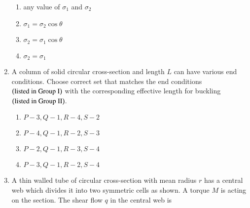 \documentclass[journal,onecolumn]{IEEEtran}
\theoremstyle{remark}
\begin{document}
\begin{enumerate}
\begin{center}
	\end{center}
	\begin{enumerate}
		\item any value of $\sigma_1$ and $\sigma_2$
		\item $\sigma_1 = \sigma_2 \cos{\theta}$
		\item $\sigma_2 = \sigma_1 \cos{\theta}$
		\item $\sigma_2 = \sigma_1$
	\end{enumerate}

    \item A column of solid circular cross-section and length $L$ can have various end conditions. Choose correct set that matches the end conditions $\left(\text{listed in Group I}\right)$ with the corresponding effective length for buckling $\left(\text{listed in Group II}\right)$.

	\begin{table}[h!]
		\centering
		
		\label{taba1.q64}
	\end{table}

	\begin{enumerate}
		\item $P - 3, Q - 1, R - 4, S - 2$
		\item $P - 4, Q - 1, R - 2, S - 3$
		\item $P - 2, Q - 1, R - 3, S - 4$
		\item $P - 3, Q - 1, R - 2, S - 4$
	\end{enumerate}

    \item A thin walled tube of circular cross-section with mean radius $r$ has a central web which divides it into two symmetric cells as shown. A torque $M$ is acting on the section. The shear flow $q$ in the central web is
	\begin{center}
\end{center}
\end{enumerate}
\end{document}
